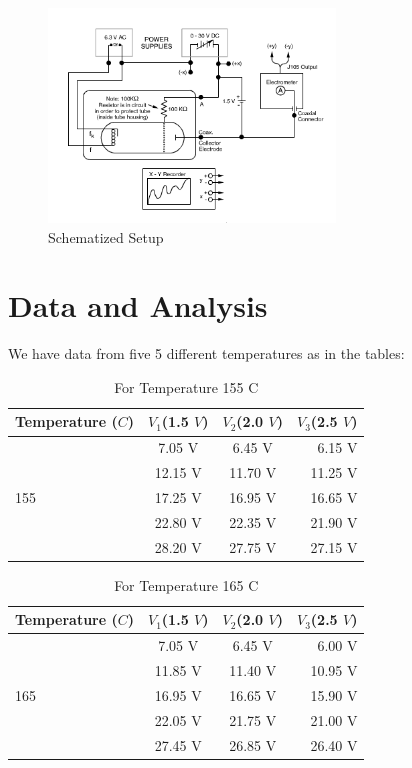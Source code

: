 \documentclass[aps,twocolumn,secnumarabic,nobalancelastpage,amsmath,amssymb,
nofootinbib]{revtex4}
\begin{document}
\begin{figure}[htbp]
\includegraphics[width=3in]{experiment2}
\caption{Schematized Setup}
\label{fig:schematic}
\end{figure}




\section{Data and Analysis}


We have data from five 5 different temperatures as in the tables:





\begin{center}
\begin{table}[htbp]
\begin{tabular}{|l|c|c|r|}
\hline
{\small Temperature ($C$)} & {\small $V_1$(1.5 $V$)} & {\small $V_2$(2.0 $V$)} & {\small $V_3$(2.5 $V$)} \\
\hline
		& 7.05 V 		& 6.45 V& 	6.15 V \\
 		& 12.15 V		& 11.70 V & 11.25 V \\
155 	& 17.25 V 		& 16.95 V & 16.65 V \\
 		& 22.80 V 		& 22.35 V & 21.90 V \\
 		& 28.20 V 		& 27.75 V & 27.15 V \\

\hline
\end{tabular}
\caption{\label{tab:linfitresults} For Temperature 155 C }
\end{table}
\end{center}

\begin{center}
\begin{table}[htbp]
\begin{tabular}{|l|c|c|r|}
\hline
{\small Temperature ($C$)} & {\small $V_1$(1.5 $V$)} & {\small $V_2$(2.0 $V$)} & {\small $V_3$(2.5 $V$)} \\
\hline
		& 7.05 V 		& 6.45 V& 	6.00 V \\
 		& 11.85 V		& 11.40 V & 10.95 V \\
165 	& 16.95 V 		& 16.65 V & 15.90 V \\
 		& 22.05 V 		& 21.75 V & 21.00 V \\
 		& 27.45 V 		& 26.85 V & 26.40 V \\

\hline
\end{tabular}
\caption{\label{tab:linfitresults} For Temperature 165 C}
\end{table}
\end{center}
\end{document}
